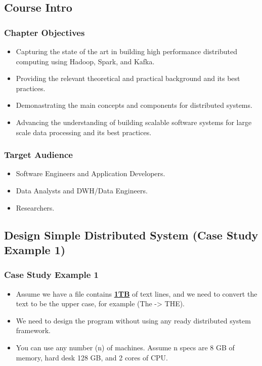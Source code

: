 \subsection{Course Intro}
\begin{frame}
\frametitle{Chapter Objectives}

\begin{itemize} [<+->]
	\item Capturing the state of the art in building high performance distributed computing using Hadoop, Spark, and Kafka.
	\item Providing the relevant theoretical and practical background and its best practices.
	\item Demonastrating the main concepts and components for distributed systems. 
	\item Advancing the understanding of building scalable software systems for large scale data processing and its best practices. 
\end{itemize}

\end{frame}


\begin{frame}
	\frametitle{Target Audience}
	
	\begin{itemize} [<+->]
		\item Software Engineers and Application Developers.
		\item Data Analysts and DWH/Data Engineers.
		\item Researchers.
	\end{itemize}
	
\end{frame}


\subsection{Design Simple Distributed System (Case Study Example 1)}
\begin{frame}
	\frametitle{Case Study Example 1}
	\begin{itemize}  [<+->]
		\item Assume we have a file contains \textbf{\underline{1TB}} of text lines, and we need to convert the text to be the upper case, for example (The -> THE).
		\item We need to design the program without using any ready distributed system framework.
		\item You can use any number (n) of machines. Assume n specs are 8 GB of memory, hard desk 128 GB, and 2 cores of CPU.

	\end{itemize}
\end{frame}

